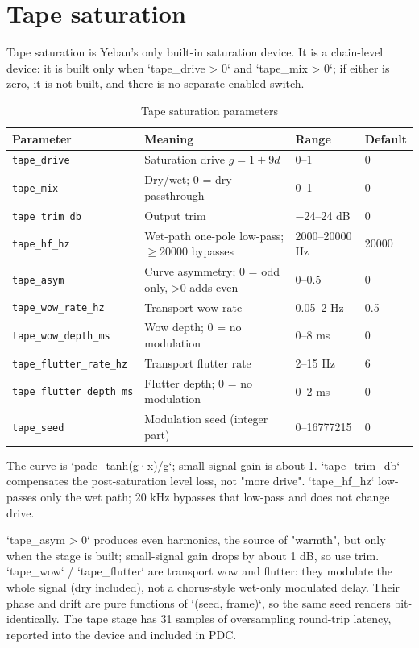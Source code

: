 \section{Tape saturation}

Tape saturation is Yeban's only built-in saturation device. It is a chain-level device: it is built only when `tape_drive > 0` and `tape_mix > 0`; if either is zero, it is not built, and there is no separate enabled switch.

\begin{table}[htbp]
\centering
\small
\begin{tabular}{@{}llll@{}}
\hline
Parameter & Meaning & Range & Default \\
\hline
\texttt{tape\_drive} & Saturation drive $g=1+9d$ & 0–1 & 0 \\
\texttt{tape\_mix} & Dry/wet; 0 = dry passthrough & 0–1 & 0 \\
\texttt{tape\_trim\_db} & Output trim & −24–24 dB & 0 \\
\texttt{tape\_hf\_hz} & Wet-path one-pole low-pass; $\geq$20000 bypasses & 2000–20000 Hz & 20000 \\
\texttt{tape\_asym} & Curve asymmetry; 0 = odd only, >0 adds even & 0–0.5 & 0 \\
\texttt{tape\_wow\_rate\_hz} & Transport wow rate & 0.05–2 Hz & 0.5 \\
\texttt{tape\_wow\_depth\_ms} & Wow depth; 0 = no modulation & 0–8 ms & 0 \\
\texttt{tape\_flutter\_rate\_hz} & Transport flutter rate & 2–15 Hz & 6 \\
\texttt{tape\_flutter\_depth\_ms} & Flutter depth; 0 = no modulation & 0–2 ms & 0 \\
\texttt{tape\_seed} & Modulation seed (integer part) & 0–16777215 & 0 \\
\hline
\end{tabular}
\caption{Tape saturation parameters}
\label{tab:tape-params}
\end{table}

The curve is `pade_tanh(g·x)/g`; small-signal gain is about 1. `tape_trim_db` compensates the post-saturation level loss, not "more drive". `tape_hf_hz` low-passes only the wet path; 20 kHz bypasses that low-pass and does not change drive.

`tape_asym > 0` produces even harmonics, the source of "warmth", but only when the stage is built; small-signal gain drops by about 1 dB, so use trim. `tape_wow` / `tape_flutter` are transport wow and flutter: they modulate the whole signal (dry included), not a chorus-style wet-only modulated delay. Their phase and drift are pure functions of `(seed, frame)`, so the same seed renders bit-identically. The tape stage has 31 samples of oversampling round-trip latency, reported into the device and included in PDC.

